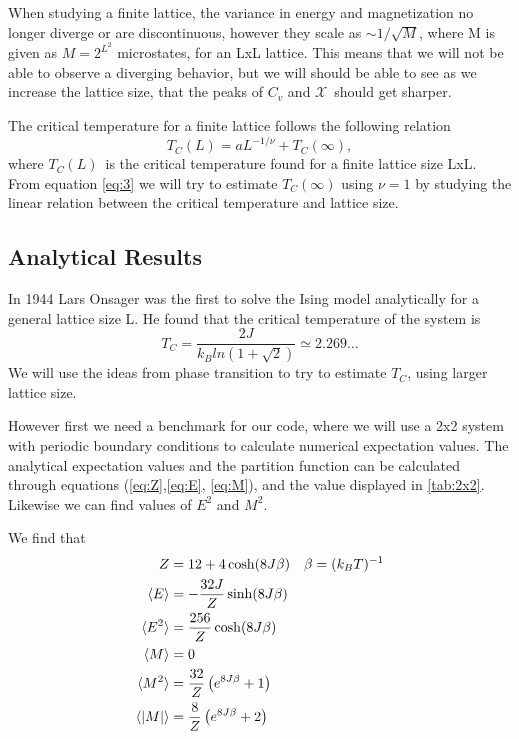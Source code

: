 \documentclass[%
reprint,
nofootinbib,
amsmath,amssymb,
aps,
]{revtex4-1}
\begin{document}
When studying a finite lattice, the variance in energy and magnetization no longer diverge or are discontinuous, however they scale as $\sim 1/\sqrt{M}$, where M is given as $M = 2^{L^2}$ microstates, for an LxL lattice. This means that we will not be able to observe a diverging behavior, but we will should be able to see as we increase the lattice size, that the peaks of $C_v$ and $\mathcal{X}$ should get sharper. 

The critical temperature for a finite lattice follows the following relation 
\begin{equation}\label{eq:3}
	T_C(L) = aL^{-1/\nu} + T_C(\infty),
\end{equation}
where $T_C(L)$ is the critical temperature found for a finite lattice size LxL. From equation \eqref{eq:3} we will try to estimate $T_C(\infty)$ using $\nu = 1$ by studying the linear relation between the critical temperature and lattice size. 


\subsection{Analytical Results} %
In 1944 Lars Onsager was the first to solve the Ising model analytically for a general lattice size L\cite{LarsOnsager}. He found that the critical temperature of the system is 
\begin{equation}
	T_C = \frac{2J}{k_Bln(1+\sqrt{2})}\simeq 2.269\dots
\end{equation} 
We will use the ideas from phase transition to try to estimate $T_C$, using larger lattice size. 

However first we need a benchmark for our code, where we will use a 2x2 system with periodic boundary conditions to calculate numerical expectation values. The analytical expectation values and the partition function can be calculated through equations (\ref{eq:Z},\ref{eq:E}, \ref{eq:M}), and the value displayed in \autoref{tab:2x2}. Likewise we can find values of $E^2$ and $M^2$. 

We find that 
\begin{align}
	Z &= 12 + 4\cosh(8J\beta) && \beta = (k_BT)^{-1}\\
	\langle E\rangle &= -\frac{32J}{Z}\sinh(8J\beta)\\
	\langle E^2\rangle &= \frac{256}{Z}\cosh(8J\beta)\\
	\langle M\rangle &= 0\\
	\langle M^2\rangle &=\frac{32}{Z}\left(e^{8J\beta} + 1\right)\\
	\langle \abs{M}\rangle &= \frac{8}{Z}\left(e^{8J\beta} + 2\right)
\end{align}
\end{document}
